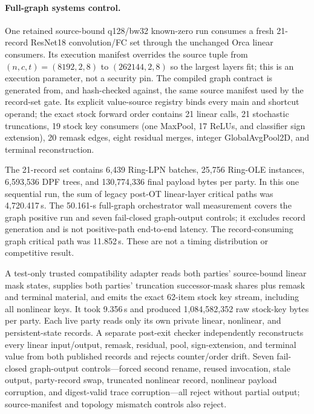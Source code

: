 \documentclass[11pt]{article}
\begin{document}
\paragraph{Full-graph systems control.}
One retained source-bound q128/bw32 known-zero run consumes a fresh 21-record
ResNet18 convolution/FC set through the unchanged Orca linear consumers. Its
execution manifest overrides the source tuple from $(n,c,t)=(8192,2,8)$ to
$(262144,2,8)$ so the largest layers fit; this is an execution parameter, not a
security pin. The compiled graph contract is generated from, and hash-checked
against, the same source manifest used by the record-set gate. Its explicit
value-source registry binds every main and shortcut operand; the exact stock
forward order contains 21 linear calls, 21 stochastic truncations, 19 stock key
consumers (one MaxPool, 17 ReLUs, and classifier sign extension), 20 remask
edges, eight residual merges, integer GlobalAvgPool2D, and terminal
reconstruction.

The 21-record set contains 6{,}439 Ring-LPN batches, 25{,}756 Ring-OLE
instances, 6{,}593{,}536 DPF trees, and 130{,}774{,}336 final payload bytes per
party. In this one sequential run, the sum of legacy post-OT linear-layer
critical paths was 4{,}720.417\,s. The 50.161-s full-graph orchestrator wall
measurement covers the graph positive run and seven fail-closed graph-output
controls; it excludes record generation and is not positive-path end-to-end
latency. The record-consuming graph critical path was 11.852\,s. These
are not a timing distribution or competitive result.

A test-only trusted compatibility adapter reads both parties' source-bound
linear mask states, supplies both parties' truncation successor-mask shares
plus remask and terminal material, and emits the exact 62-item stock key stream,
including all nonlinear keys. It took 9.356\,s and produced
1{,}084{,}582{,}352 raw stock-key bytes per party. Each live party reads only
its own private linear, nonlinear, and persistent-state records. A separate
post-exit checker independently reconstructs every linear input/output, remask,
residual, pool, sign-extension, and terminal value from both published records
and rejects counter/order drift. Seven fail-closed
graph-output controls---forced second rename, reused invocation, stale output,
party-record swap, truncated nonlinear record, nonlinear payload corruption,
and digest-valid trace corruption---all reject without partial output;
source-manifest and topology mismatch controls also reject.
\end{document}
